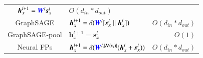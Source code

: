 \begin{table}[H]
\begin{footnotesize}
\begin{tabular}{clr}
            $\boldsymbol{h}_x^{l+1} = \textcolor{blue}{\boldsymbol{W}}^l  \boldsymbol{s}_x^{l}$                                                                                                                              &
            $O(d_{in} * d_{out})$                                                                                                                                                                                              \\
            GraphSAGE  \cite{hamilton2017_graphsage}                                                                                                                                                                         &
            $\boldsymbol{h}_x^{l+1} =   \delta(\textcolor{blue}{\boldsymbol{W}}^l  [\boldsymbol{s}_x^{l} \parallel \boldsymbol{h}_x^l])$                                                                                     &
            $O(d_{in} * d_{out})$                                                                                                                                                                                              \\
            GraphSAGE-pool   \cite{hamilton2017_graphsage}                                                                                                                                                                   &
            $\boldsymbol{h}_x^{l+1} = \boldsymbol{s}_x^l$                                                                                                                                                                    &
            $O(1)$                                                                                                                                                                                                             \\
            Neural FPs        \cite{duvenaud2015_neural_fps}                                                                                                                                                                 &
            $\boldsymbol{h}_x^{l+1} = \delta(\textcolor{blue}{\boldsymbol{W}}^{l, |\mathcal{N}(v_i)|}  (\boldsymbol{h}_x^l + \boldsymbol{s}_x^{l}))$                                                                           &
            $O(d_{in} * d_{out})$                                                                                                                                                                                              \\

\end{tabular}
\end{footnotesize}
\end{table}
